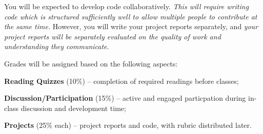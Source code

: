 \documentclass[12pt]{mcplain}
\begin{document}
\begin{leftindent}
  You will be expected to develop code collaboratively. \textit{This will
  require writing code which is structured sufficiently well to allow multiple
  people to contribute at the same time.} However, you will write your project
  reports separately, and \textit{your project reports will be separately
  evaluated on the quality of work and understanding they communicate}.

  \end{leftindent}


Grades will be assigned based on the following aspects:

\begin{leftindentlist*}{\baselineskip}

 \item \textbf{Reading Quizzes} (10\%) -- completion of required readings before
 classes;

 \item \textbf{Discussion/Participation} (15\%) -- active and engaged
 particpation during in-class discussion and development time;

 \item \textbf{Projects} (25\% each) -- project reports and code, with rubric
 distributed later.

\end{leftindentlist*}

\end{document}
